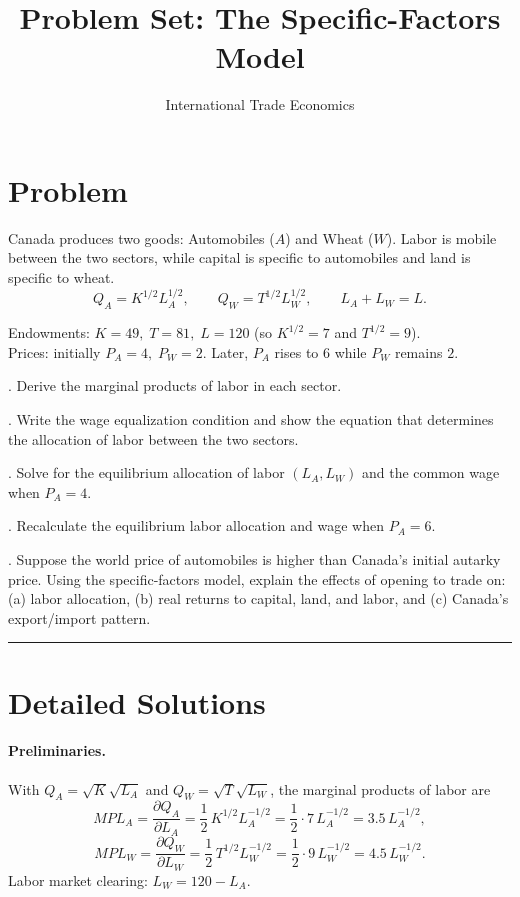 \documentclass[12pt]{article}
\title{Problem Set: The Specific-Factors Model }
\author{International Trade Economics}
\date{}
\begin{document}

\section*{Problem}

Canada produces two goods: Automobiles ($A$) and Wheat ($W$). Labor is mobile between the two sectors, while capital is specific to automobiles and land is specific to wheat.
\[
Q_A = K^{1/2}L_A^{1/2}, 
\qquad 
Q_W = T^{1/2}L_W^{1/2},
\qquad 
L_A + L_W = L.
\]

Endowments: $K = 49,\; T = 81,\; L = 120$ (so $K^{1/2}=7$ and $T^{1/2}=9$). \\
Prices: initially $P_A = 4,\; P_W = 2$. Later, $P_A$ rises to $6$ while $P_W$ remains $2$.

\bigskip

. Derive the marginal products of labor in each sector.

\bigskip

. Write the wage equalization condition and show the equation that determines the allocation of labor between the two sectors.

\bigskip

. Solve for the equilibrium allocation of labor $(L_A, L_W)$ and the common wage when $P_A=4$.

\bigskip

. Recalculate the equilibrium labor allocation and wage when $P_A=6$.

\bigskip

. Suppose the world price of automobiles is higher than Canada’s initial autarky price. Using the specific-factors model, explain the effects of opening to trade on: (a) labor allocation, (b) real returns to capital, land, and labor, and (c) Canada’s export/import pattern.

\bigskip
\hrule
\bigskip

\section*{Detailed Solutions}

\paragraph{Preliminaries.} With $Q_A=\sqrt{K}\sqrt{L_A}$ and $Q_W=\sqrt{T}\sqrt{L_W}$, the marginal products of labor are
\[
MPL_A=\frac{\partial Q_A}{\partial L_A}=\frac{1}{2}\,K^{1/2}L_A^{-1/2}=\frac{1}{2}\cdot 7\,L_A^{-1/2}=3.5\,L_A^{-1/2},
\]
\[
MPL_W=\frac{\partial Q_W}{\partial L_W}=\frac{1}{2}\,T^{1/2}L_W^{-1/2}=\frac{1}{2}\cdot 9\,L_W^{-1/2}=4.5\,L_W^{-1/2}.
\]
Labor market clearing: $L_W=120-L_A$.
\end{document}
